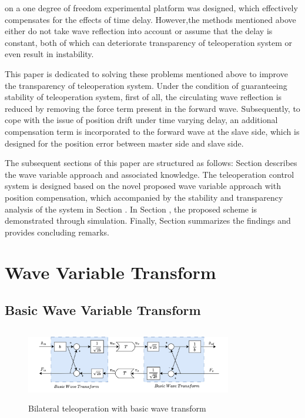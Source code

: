 on a one degree of freedom experimental platform was designed,
which effectively compensates for the effects of time delay.
However,the methods mentioned above either do not take wave reflection into account
or assume that the delay is constant,
both of which can deteriorate transparency of teleoperation system
or even result in instability.
\par This paper is dedicated to solving these problems mentioned 
above to improve the transparency of teleoperation system.
Under the condition of guaranteeing stability of teleoperation system,
first of all, the circulating wave reflection is reduced 
by removing the force term present in the forward wave. 
Subsequently, to cope with the issue of position drift under time varying delay,
an additional compensation term is incorporated to the forward wave at the slave side, 
which is designed for the position error between master side and slave side.
\par The subsequent sections of this paper are structured as follows:
Section \uppercase\expandafter{} describes the wave variable approach and associated knowledge.
The teleoperation control system is designed based on the novel proposed wave variable approach
with position compensation, which accompanied by 
the stability and transparency analysis of the system
in Section \uppercase\expandafter{}.
In Section \uppercase\expandafter{},
the proposed scheme is demonstrated through simulation.
Finally, Section \uppercase\expandafter{} summarizes the findings and provides concluding remarks.


\section{Wave Variable Transform}

\subsection{Basic Wave Variable Transform}
\begin{figure}[htbp]
    \centerline{\includegraphics[height=3.2cm,width=9cm]{basic_wave.jpg}}
    \caption{Bilateral teleoperation with basic wave transform}
    \label{fig1}
\end{figure}

